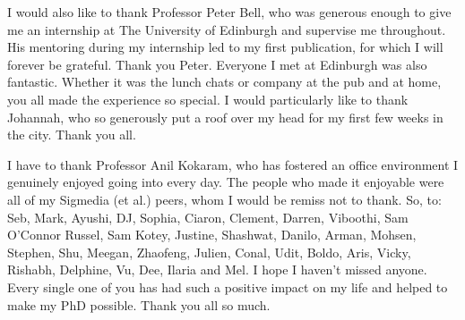 \documentclass[a4paper,oneside,12pt]{book}
\numberwithin{equation}{chapter} %
\begin{document}

I would also like to thank Professor Peter Bell, who was generous enough to give me an internship at The University of Edinburgh and supervise me throughout. His mentoring during my internship led to my first publication, for which I will forever be grateful. Thank you Peter. Everyone I met at Edinburgh was also fantastic. Whether it was the lunch chats or company at the pub and at home, you all made the experience so special. I would particularly like to thank Johannah, who so generously put a roof over my head for my first few weeks in the city. Thank you all.




I have to thank Professor Anil Kokaram, who has fostered an office environment I genuinely enjoyed going into every day. The people who made it enjoyable were all of my Sigmedia (et al.) peers, whom I would be remiss not to thank. So, to: Seb, Mark, Ayushi, DJ, Sophia, Ciaron, Clement, Darren, Viboothi, Sam O'Connor Russel, Sam Kotey, Justine, Shashwat, Danilo, Arman, Mohsen, Stephen, Shu, Meegan, Zhaofeng, Julien, Conal, Udit, Boldo, Aris, Vicky, Rishabh, Delphine, Vu, Dee, Ilaria and Mel. I hope I haven't missed anyone. Every single one of you has had such a positive impact on my life and helped to make my PhD possible. Thank you all so much. 
\end{document}
